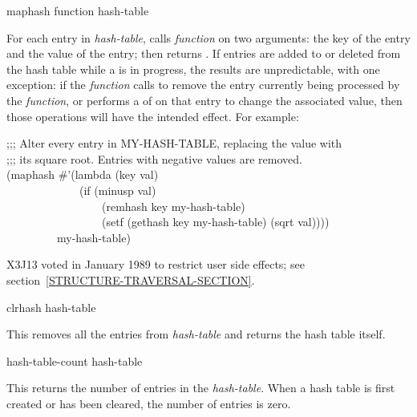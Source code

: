 \begin{defun}[Function]
maphash function hash-table

For each entry in \emph{hash-table},  calls
\emph{function} on two arguments:
the key of the entry and the value of the entry;  then returns .
If entries are added to or deleted from the hash table while a 
is in progress, the results are unpredictable, with one exception:
if the \emph{function} calls  to remove the entry currently
being processed by the \emph{function}, or performs a  of
 on that entry to change the associated value, then those
operations will have the intended effect.
For example:
\begin{lisp}
;;; Alter every entry in MY-HASH-TABLE, replacing the value with \\
;;; its square root.  Entries with negative values are removed. \\
(maphash \#'(lambda (key val) \\
~~~~~~~~~~~~~(if (minusp val) \\
~~~~~~~~~~~~~~~~~(remhash key my-hash-table) \\
~~~~~~~~~~~~~~~~~(setf (gethash key my-hash-table) (sqrt val)))) \\
~~~~~~~~~my-hash-table)
\end{lisp}

\begin{new}
X3J13 voted in January 1989
to restrict user side effects; see section~\ref{STRUCTURE-TRAVERSAL-SECTION}.
\end{new}
\end{defun}

\begin{defun}[Function]
clrhash hash-table

This removes all the entries from \emph{hash-table}
and returns the hash table itself.
\end{defun}

\begin{defun}[Function]
hash-table-count hash-table

This returns the number of entries in the \emph{hash-table}.
When a hash table is first created or has been cleared,
the number of entries is zero.
\end{defun}

